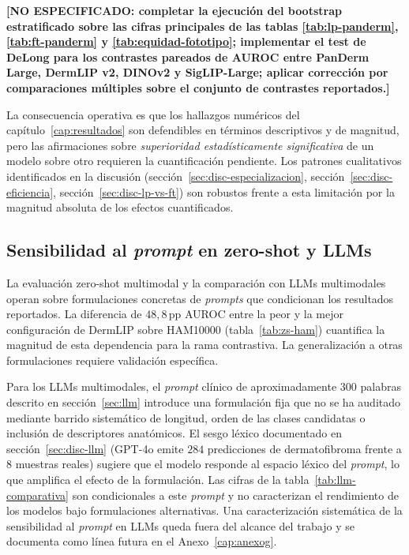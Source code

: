 \textbf{[NO ESPECIFICADO: completar la ejecución del bootstrap
estratificado sobre las cifras principales de las tablas
\ref{tab:lp-panderm}, \ref{tab:ft-panderm} y
\ref{tab:equidad-fototipo}; implementar el test de DeLong para los
contrastes pareados de AUROC entre PanDerm Large, DermLIP v2,
DINOv2 y SigLIP-Large; aplicar corrección por comparaciones
múltiples sobre el conjunto de contrastes reportados.]}

La consecuencia operativa es que los hallazgos numéricos del
capítulo~\ref{cap:resultados} son defendibles en términos
descriptivos y de magnitud, pero las afirmaciones sobre
\emph{superioridad estadísticamente significativa} de un modelo
sobre otro requieren la cuantificación pendiente. Los patrones
cualitativos identificados en la discusión
(secci\'on~\ref{sec:disc-especializacion}, secci\'on~\ref{sec:disc-eficiencia},
secci\'on~\ref{sec:disc-lp-vs-ft}) son robustos frente a esta limitación
por la magnitud absoluta de los efectos cuantificados.

\subsection{Sensibilidad al \emph{prompt} en zero-shot y LLMs}
\label{sec:lim-prompts}

La evaluación zero-shot multimodal y la comparación con LLMs
multimodales operan sobre formulaciones concretas de \emph{prompts}
que condicionan los resultados reportados. La diferencia de
$48{,}8$\,pp AUROC entre la peor y la mejor configuración de
DermLIP sobre HAM10000 (tabla~\ref{tab:zs-ham}) cuantifica la
magnitud de esta dependencia para la rama contrastiva. La
generalización a otras formulaciones requiere validación
específica.

Para los LLMs multimodales, el \emph{prompt} clínico de
aproximadamente $300$ palabras descrito en secci\'on~\ref{sec:llm}
introduce una formulación fija que no se ha auditado mediante
barrido sistemático de longitud, orden de las clases candidatas o
inclusión de descriptores anatómicos. El sesgo léxico documentado
en secci\'on~\ref{sec:disc-llm} (GPT-4o emite $284$ predicciones de
dermatofibroma frente a $8$ muestras reales) sugiere que el
modelo responde al espacio léxico del \emph{prompt}, lo que
amplifica el efecto de la formulación. Las cifras de la
tabla~\ref{tab:llm-comparativa} son condicionales a este
\emph{prompt} y no caracterizan el rendimiento de los modelos bajo
formulaciones alternativas. Una caracterización sistemática de la
sensibilidad al \emph{prompt} en LLMs queda fuera del alcance del
trabajo y se documenta como línea futura en el
Anexo~\ref{cap:anexog}.

